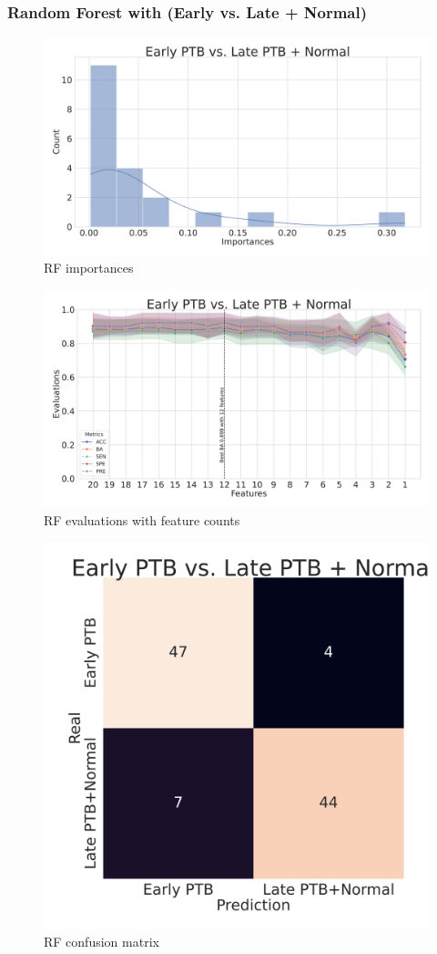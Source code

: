 \documentclass{beamer}
\begin{document}
    \begin{frame}[allowframebreaks]
        \frametitle{Random Forest with (Early vs. Late + Normal)}

        \begin{figure}
            \includegraphics[width=0.8 \linewidth]{figures/RandomForest_Proportion/RF-two.DADA2.homd.Mouth/importances.pdf}
            \caption{RF importances}
        \end{figure}

        \begin{figure}
            \includegraphics[width=0.8 \linewidth]{figures/RandomForest_Proportion/RF-two.DADA2.homd.Mouth/metrics.pdf}
            \caption{RF evaluations with feature counts}
        \end{figure}

        \begin{figure}
            \includegraphics[width=0.5 \linewidth]{figures/RandomForest_Proportion/RF-two.DADA2.homd.Mouth/heatmap.pdf}
            \caption{RF confusion matrix}
        \end{figure}
    \end{frame}
\end{document}

